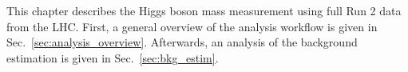 This chapter describes the Higgs boson mass measurement using full Run 2 data from the LHC.
First, a general overview of the analysis workflow is given in Sec.~\ref{sec:analysis_overview}.
Afterwards, an analysis of the background estimation is given in Sec.~\ref{sec:bkg_estim}.

